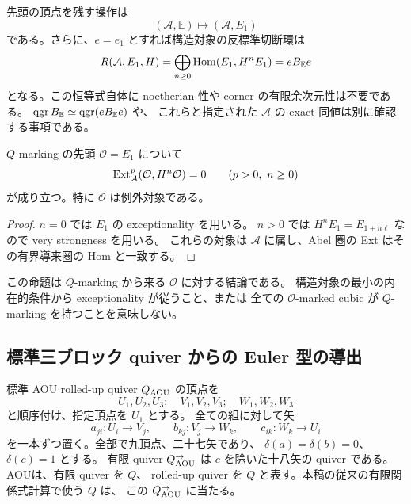 先頭の頂点を残す操作は
\begin{equation}\label{eq:q-to-o-on-objects}
 (\mathcal A,\mathbb E)\longmapsto(\mathcal A,E_1)
\end{equation}
である。さらに、$e=e_1$ とすれば構造対象の反標準切断環は
\begin{equation}\label{eq:q-o-corner}
 R(\mathcal A,E_1,H)
 =\bigoplus_{n\ge0}\operatorname{Hom}(E_1,H^nE_1)=eB_{\mathbb E}e
\end{equation}
となる。この恒等式自体に noetherian 性や corner の有限余次元性は不要である。
$\operatorname{qgr} B_{\mathbb E}\simeq\operatorname{qgr}(eB_{\mathbb E}e)$ や、
これらと指定された $\mathcal A$ の exact 同値は別に確認する事項である。

\begin{proposition}
\label{prop:q-leading-self-ext}
$Q$-marking の先頭 $\mathcal O=E_1$ について
\[
 \operatorname{Ext}^p_{\mathcal A}(\mathcal O,H^n\mathcal O)=0
 \qquad(p>0,\ n\ge0)
\]
が成り立つ。特に $\mathcal O$ は例外対象である。
\end{proposition}
\begin{proof}
$n=0$ では $E_1$ の exceptionality を用いる。
$n>0$ では $H^nE_1=E_{1+n\ell}$ なので very strongness を用いる。
これらの対象は $\mathcal A$ に属し、Abel 圏の Ext はその有界導来圏の Hom と一致する。
\end{proof}

この命題は $Q$-marking から来る $\mathcal O$ に対する結論である。
構造対象の最小の内在的条件から exceptionality が従うこと、または
全ての $\mathcal O$-marked cubic が $Q$-marking を持つことを意味しない。

\subsection{標準三ブロック quiver からの Euler 型の導出}
標準 AOU rolled-up quiver $Q_{\rm AOU}$ の頂点を
\[
 U_1,U_2,U_3;\quad V_1,V_2,V_3;\quad W_1,W_2,W_3
\]
と順序付け、指定頂点を $U_1$ とする。
全ての組に対して矢
\[
 a_{ji}:U_i\longrightarrow V_j,\qquad
 b_{kj}:V_j\longrightarrow W_k,\qquad
 c_{ik}:W_k\longrightarrow U_i
\]
を一本ずつ置く。全部で九頂点、二十七矢であり、
$\delta(a)=\delta(b)=0$、$\delta(c)=1$ とする。
有限 quiver $Q_{\rm AOU}^{\to}$ は $c$ を除いた十八矢の quiver である。
AOU\cite[Figures 4.1--4.2, (4.2)--(4.9)]{AOU}は、有限 quiver を $Q$、
rolled-up quiver を $\widetilde Q$ と表す。本稿の従来の有限関係式計算で使う $Q$ は、
この $Q_{\rm AOU}^{\to}$ に当たる。

